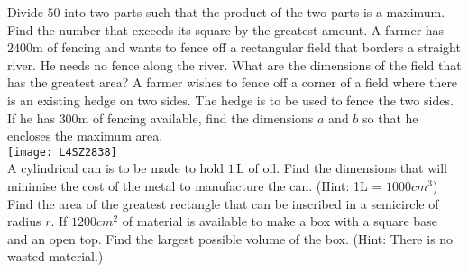 \begin{Exercise}[title={Rate of Change},label=exRateOfChange]
\begin{Exercise}[title={Related Rates},label=exRelatedRates]
\end{Exercise}
\begin{Answer}[ref={exRelatedRates}]
	
\end{Answer}%

\begin{Exercise}[title={Optimisation},label=exOptimisation]
	\Question Divide $50$ into two parts such that the product of the two parts is a maximum. %
	\Question Find the number that exceeds its square by the greatest amount. %
	\Question A farmer has $2400 \mbox{m}$ of fencing and wants to fence off a rectangular field that borders a straight river. He needs no fence along the river. What are the dimensions of the field that has the greatest area? %
	\Question A farmer wishes to fence off a corner of a field where there is an existing hedge on two sides. The hedge is to be used to fence the two sides. If he has $300 \mbox{m}$ of fencing available, find the dimensions $a$ and $b$ so that he encloses the maximum area.\\ 
	 \texttt{[image: L4SZ2838]}\\ %
	\Question A cylindrical can is to be made to hold $1\,$L of oil. Find the dimensions that will minimise the cost of the metal to manufacture the can. (Hint: 1\thinspace L = $1000 cm^{3}$) %
	\Question Find the area of the greatest rectangle that can be inscribed in a semicircle	of radius $r$. %
	\Question If $1200 cm^{2}$ of material is available to make a box with a square base and an open top. Find the largest possible volume of the box. (Hint: There is no wasted material.) %

\end{Exercise}
\begin{Answer}[ref={exOptimisation}]
	
\end{Answer}%